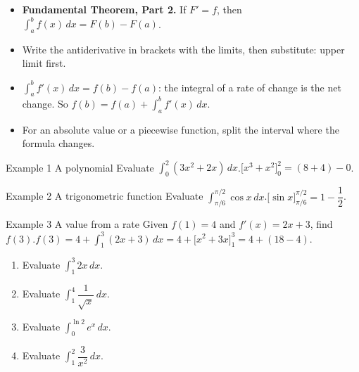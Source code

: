 \documentclass[11pt]{article}
\begin{document}

\begin{ideabox}
\begin{itemize}[leftmargin=*,itemsep=2pt,topsep=2pt]
  \item \textbf{Fundamental Theorem, Part 2.} If $F'=f$, then $\displaystyle\int_{a}^{b}f(x)\,dx=F(b)-F(a)$.
  \item Write the antiderivative in brackets with the limits, then substitute: upper limit first.
  \item $\displaystyle\int_{a}^{b}f'(x)\,dx=f(b)-f(a)$: the integral of a rate of change is the net change. So $f(b)=f(a)+\displaystyle\int_{a}^{b}f'(x)\,dx$.
  \item For an absolute value or a piecewise function, split the interval where the formula changes.
\end{itemize}
\end{ideabox}

\begin{example}{Example 1 \textperiodcentered{} A polynomial}
Evaluate $\displaystyle\int_{0}^{2}\left(3x^2+2x\right)\,dx$.\soln $\Big[x^3+x^2\Big]_0^2=(8+4)-0$.
\end{example}

\begin{example}{Example 2 \textperiodcentered{} A trigonometric function}
Evaluate $\displaystyle\int_{\pi/6}^{\pi/2}\cos x\,dx$.\soln $\Big[\sin x\Big]_{\pi/6}^{\pi/2}=1-\dfrac12$.
\end{example}

\begin{example}{Example 3 \textperiodcentered{} A value from a rate}
Given $f(1)=4$ and $f'(x)=2x+3$, find $f(3)$.\soln $f(3)=4+\displaystyle\int_{1}^{3}(2x+3)\,dx=4+\Big[x^2+3x\Big]_1^3=4+(18-4)$.
\end{example}

\newpage
{}

\begin{enumerate}[leftmargin=*,itemsep=2pt]
  \item Evaluate $\displaystyle\int_{1}^{3}2x\,dx$.\work{2.3cm}
  \item Evaluate $\displaystyle\int_{1}^{4}\dfrac{1}{\sqrt{x}}\,dx$.\work{2.3cm}
  \item Evaluate $\displaystyle\int_{0}^{\ln2}e^{x}\,dx$.\work{2.3cm}
  \item Evaluate $\displaystyle\int_{1}^{2}\dfrac{3}{x^2}\,dx$.\work{2.3cm}
\end{enumerate}
\end{document}
